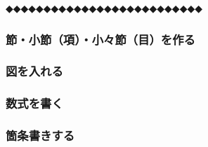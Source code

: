 \vspace{\Cvs}
\noindent
◆◆◆◆◆◆◆◆◆◆◆◆◆◆◆◆◆◆◆◆◆◆◆◆◆◆









\subsubsection{節・小節（項）・小々節（目）を作る}


\subsubsection{図を入れる}


\subsubsection{数式を書く}


\subsubsection{箇条書きする}